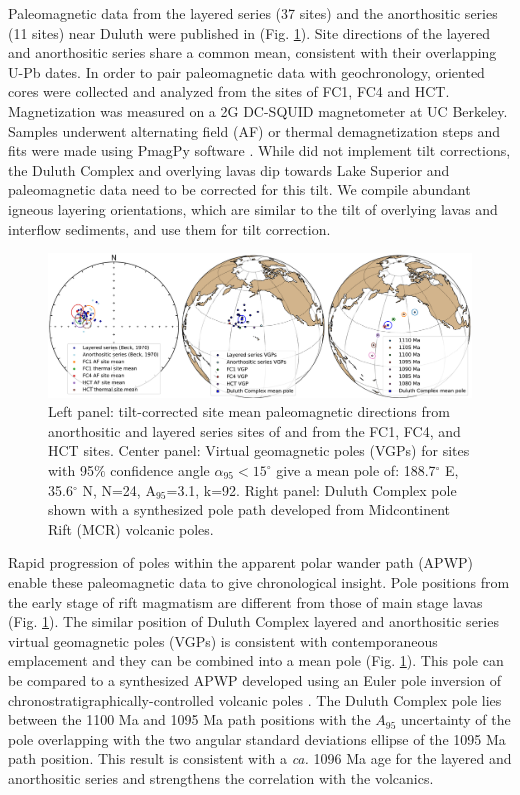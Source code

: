\documentclass[11pt,letterpaper]{article}
\begin{document}
Paleomagnetic data from the layered series (37 sites) and the anorthositic series (11 sites) near Duluth were published in \cite{Beck1970a} (Fig. \ref{fig:poles}). Site directions of the layered and anorthositic series share a common mean, consistent with their overlapping U-Pb dates. In order to pair paleomagnetic data with geochronology, oriented cores were collected and analyzed from the sites of FC1, FC4 and HCT. Magnetization was measured on a 2G DC-SQUID magnetometer at UC Berkeley. Samples underwent alternating field (AF) or thermal demagnetization steps and fits were made using PmagPy software \citep{Tauxe2016a}. While \cite{Beck1970a} did not implement tilt corrections, the Duluth Complex and overlying lavas dip towards Lake Superior and paleomagnetic data need to be corrected for this tilt. We compile abundant igneous layering orientations, which are similar to the tilt of overlying lavas and interflow sediments, and use them for tilt correction.

\begin{figure}[!ht]
\noindent\includegraphics[width=\textwidth]{./Figures/Duluth_Complex_pole.pdf}
\caption{\small{Left panel: tilt-corrected site mean paleomagnetic directions from anorthositic and layered series sites of \cite{Beck1970a} and from the FC1, FC4, and HCT sites. Center panel: Virtual geomagnetic poles (VGPs) for sites with 95$\%$ confidence angle $\alpha_{95}<15^{\circ}$ give a mean pole of: 188.7$^{\circ}$ E, 35.6$^{\circ}$ N, N=24, A$_{95}$=3.1, k=92. Right panel: Duluth Complex pole shown with a synthesized pole path developed from Midcontinent Rift (MCR) volcanic poles.}}
\label{fig:poles}
\end{figure}

Rapid progression of poles within the apparent polar wander path (APWP) enable these paleomagnetic data to give chronological insight. Pole positions from the early stage of rift magmatism are different from those of main stage lavas (Fig. \ref{fig:poles}). The similar position of Duluth Complex layered and anorthositic series virtual geomagnetic poles (VGPs) is consistent with contemporaneous emplacement and they can be combined into a mean pole (Fig. \ref{fig:poles}). This pole can be compared to a synthesized APWP developed using an Euler pole inversion of chronostratigraphically-controlled volcanic poles \citep{Swanson-Hysell2019a}. The Duluth Complex pole lies between the 1100 Ma and 1095 Ma path positions with the $A_{95}$ uncertainty of the pole overlapping with the two angular standard deviations ellipse of the 1095 Ma path position. This result is consistent with a \textit{ca.} 1096 Ma age for the layered and anorthositic series and strengthens the correlation with the volcanics.
\end{document}

